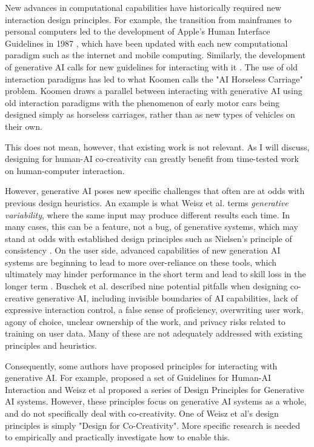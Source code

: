 New advances in computational capabilities have historically required new interaction design principles. For example, the transition from mainframes to personal computers led to the development of Apple's Human Interface Guidelines in 1987 \cite{Apple-Inc1987-am}, which have been updated with each new computational paradigm such as the internet and mobile computing. Similarly, the development of generative AI calls for new guidelines for interacting with it \cite{Weisz2024-io}. The use of old interaction paradigms has led to what Koomen \cite{Koomen2025-eu} calls the "AI Horseless Carriage" problem. Koomen draws a parallel between interacting with generative AI using old interaction paradigms with the phenomenon of early motor cars being designed simply as horseless carriages, rather than as new types of vehicles on their own. 

This does not mean, however, that existing work is not relevant. As I will discuss, designing for human-AI co-creativity can greatly benefit from time-tested work on human-computer interaction. 

However, generative AI poses new specific challenges that often are at odds with previous design heuristics. An example is what Weisz et al. \cite{Weisz2024-io} terms \textit{generative variability}, where the same input may produce different results each time. In many cases, this can be a feature, not a bug, of generative systems, which may stand at odds with established design principles such as Nielsen's principle of consistency \cite{Nielsen1994-df}. On the user side, advanced capabilities of new generation AI systems are beginning to lead to more over-reliance on these tools, which ultimately may hinder performance in the short term and lead to skill loss in the longer term \cite{Buschek2021-ks, Dell-Acqua2022-dy, Gerlich2025-as}. Buschek et al. \cite{Buschek2021-ks} described nine potential pitfalls when designing co-creative generative AI, including invisible boundaries of AI capabilities, lack of expressive interaction control, a false sense of proficiency, overwriting user work, agony of choice, unclear ownership of the work, and privacy risks related to training on user data. Many of these are not adequately addressed with existing principles and heuristics.

Consequently, some authors have proposed principles for interacting with generative AI. For example, \cite{Amershi2019-wu} proposed a set of Guidelines for Human-AI Interaction and Weisz et al \cite{Weisz2024-io} proposed a series of Design Principles for Generative AI systems. However, these principles focus on generative AI systems as a whole, and do not specifically deal with co-creativity. One of Weisz et al's design principles is simply "Design for Co-Creativity". More specific research is needed to empirically and practically investigate how to enable this. 


